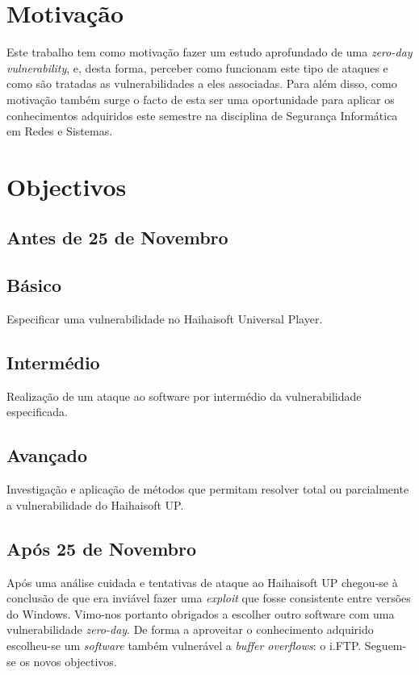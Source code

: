 \documentclass[11pt,a4paper]{article}
\begin{document}


\tableofcontents
\pagebreak

\section{Motivação}
Este trabalho tem como motivação fazer um estudo aprofundado de uma \textit{zero-day vulnerability}, e, desta forma, perceber como funcionam este tipo de ataques e como são tratadas as vulnerabilidades a eles associadas. Para além disso, como motivação também surge o facto de esta ser uma oportunidade para aplicar os conhecimentos adquiridos este semestre na disciplina de Segurança Informática em Redes e Sistemas.

\section{Objectivos}
\label{sec:objectivos}

\subsection{Antes de 25 de Novembro}

\subsection*{Básico}
Especificar uma vulnerabilidade no Haihaisoft Universal Player.
\subsection*{Intermédio}
Realização de um ataque ao software por intermédio da vulnerabilidade especificada.
\subsection*{Avançado}
Investigação e aplicação de métodos que permitam resolver total ou parcialmente a vulnerabilidade do Haihaisoft UP.

\subsection{Após 25 de Novembro}
Após uma análise cuidada e tentativas de ataque ao Haihaisoft UP chegou-se à conclusão de que era inviável fazer uma \textit{exploit} que fosse consistente entre versões do Windows. Vimo-nos portanto obrigados a escolher outro software com uma vulnerabilidade \textit{zero-day}. De forma a aproveitar o conhecimento adquirido escolheu-se um \textit{software} também vulnerável a \textit{buffer overflows}: o i.FTP. Seguem-se os novos objectivos.
\end{document}
